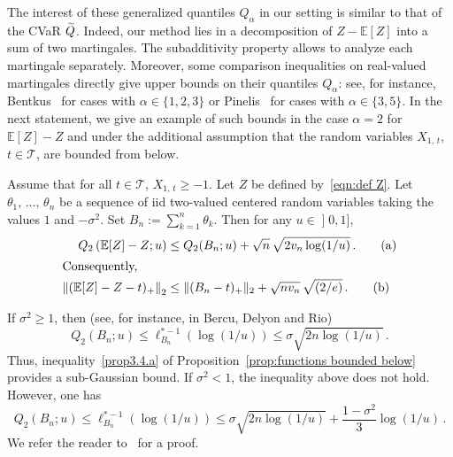 \documentclass[AHL,Unicode,longabstracts,published]{cedram}
\newcommand{\bE}{\mathbb{E}}
\newcommand{\cT}{\mathcal{T}}
\newcommand{\intervalleof}[2]{\mathopen{]} #1\mathclose{}\mathpunct{},#2\mathclose{]}}
\let\oldtilde\tilde
\renewcommand*{\tilde}[1]{\mathchoice{\widetilde{#1}}{\widetilde{#1}}{\oldtilde{#1}}{\oldtilde{#1}}}
\begin{document}
The interest of these generalized quantiles $Q_\alpha$ in our setting is similar to that of the CVaR $\tilde Q$. Indeed, our method lies in a decomposition of $Z-\bE[Z]$ into a sum of two martingales. The subadditivity property allows to analyze each martingale separately. Moreover, some comparison inequalities on real-valued martingales directly give upper bounds on their quantiles $Q_\alpha$: see, for instance, Bentkus~\cite{Bentkus04} for cases with $\alpha\in\{1,2,3\}$ or Pinelis~\cite{Pinelis06,Pinelis14a} for cases with $\alpha\in\{3,5\}$. In the next statement, we give an example of such bounds in the case $\alpha=2$ for $\bE[Z]-Z$ and under the additional assumption that the random variables $X_{1,\,t}$, $t\in\cT$, are bounded from below.

\begin{prop}\label{prop:functions bounded below}
Assume that for all $t\in\cT$, $X_{1,\,t}\geq -1$. Let $Z$ be defined by~\eqref{eqn:def Z}. Let $\theta_1,\,\ldots,\,\theta_n$ be a sequence of iid two-valued centered random variables taking the values $1$ and $-\sigma^2$. Set $B_n:=\sum_{k=1}^n \theta_k$. Then for any $u\in\intervalleof 01$,
\begin{align}
Q_2\left(\bE[Z]-Z;u\right)&\leq Q_2(B_n;u)+\sqrt{n}\,\sqrt{2v_n\log(1/u)}\,.\tag{$\rm a$}\label{prop3.4.a}\\
\intertext{Consequently,}
\left\|(\bE[Z]-Z-t)_+\right\|_2&\leq \|(B_n-t)_+\|_2+\sqrt {nv_n}\,\sqrt{(2/e)}\,.\tag{$\rm b$}\label{prop3.4.b}
\end{align}
\end{prop}

\begin{rema}
If $\sigma^2\geq 1$, then (see, for instance, \cite[Lemma~2.36]{BDR15} in Bercu, Delyon and Rio)
\begin{equation}
Q_2(B_n;u)\leq \ell_{B_n}^{*-1}(\log(1/u))\leq \sigma \sqrt{2n\log(1/u)}\,.
\end{equation}
Thus, inequality~\eqref{prop3.4.a} of Proposition~\ref{prop:functions bounded below} provides a sub-Gaussian bound. If $\sigma^2<1$, the inequality above does not hold. However, one has
\begin{equation}
Q_2(B_n;u)\leq \ell_{B_n}^{*-1}(\log(1/u))\leq \sigma \sqrt{2n\log(1/u)}+\frac{1-\sigma^2}{3}\log(1/u)\,.
\end{equation}
We refer the reader to~\cite[Theorem~2.28 and Exercise~6 in Section~2.9]{BDR15} for a proof.
\end{rema}
\end{document}
